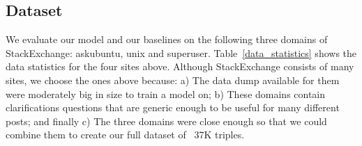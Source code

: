 \documentclass[11pt]{report}
\begin{document}
\subsection{Dataset}\label{dataset}
We evaluate our model and our baselines on the following three domains of StackExchange: askubuntu, unix and superuser.
%
Table~\ref{data_statistics} shows the data statistics for the four sites above.  Although StackExchange consists of many sites, we choose the ones above because: a) The data dump available for them were moderately big in size to train a model on; b) These domains contain clarifications questions that are generic enough to be useful for many different posts; and finally c) The three domains were close enough so that we could combine them to create our full dataset of ~37K triples.


\end{document}
